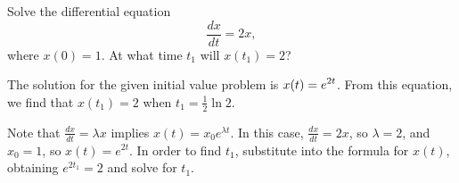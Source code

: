 \documentclass{ximera}
\begin{document}
\begin{exercise} \label{c3.1.1}
Solve the differential equation
\[
\frac{dx}{dt} = 2x,
\]
where $x(0)=1$.  At what time $t_1$ will $x(t_1)=2$?

\begin{solution}

\ans The solution for the given initial value problem is
$\displaystyle x(t) = e^{2t}$.  From this equation, we find that $x(t_1) = 2$
when $t_1 = \frac{1}{2}\ln 2$.

\soln Note that $\frac{dx}{dt} = \lambda x$ implies $x(t) =
x_0e^{\lambda t}$.  In this case, $\frac{dx}{dt} = 2x$, so
$\lambda = 2$, and $x_0 = 1$, so $x(t) = e^{2t}$.  In order to
find $t_1$, substitute into the formula for $x(t)$, obtaining
$e^{2t_1} = 2$ and solve for $t_1$.

\end{solution}
\end{exercise}
\end{document}
